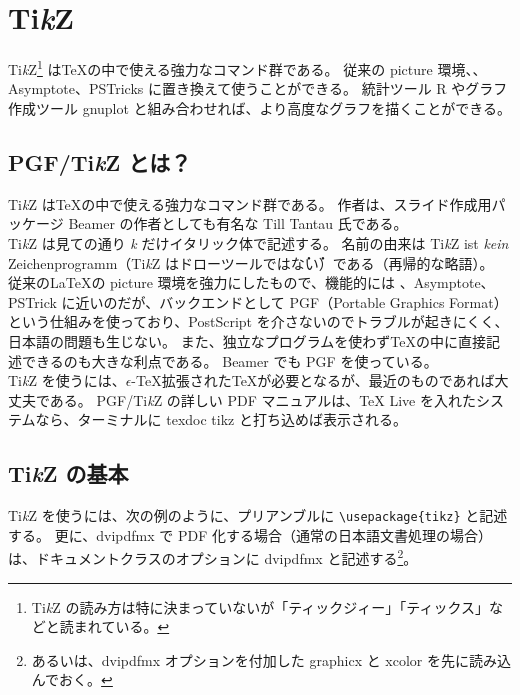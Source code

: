 \chapter{Ti\textit{k}Z}
Ti\textit{k}Z\footnote{Ti\textit{k}Z の読み方は特に決まっていないが「ティックジィー」「ティックス」などと読まれている。} は\TeX{}の中で使える強力なコマンド群である。
従来の picture 環境、\MP、Asymptote、PSTricks に置き換えて使うことができる。
統計ツール R やグラフ作成ツール gnuplot と組み合わせれば、より高度なグラフを描くことができる。
\section{PGF/Ti\textit{k}Z とは？}
Ti\textit{k}Z は\TeX{}の中で使える強力なコマンド群である。
作者は、スライド作成用パッケージ Beamer の作者としても有名な Till Tantau 氏である。\\

Ti\textit{k}Z は見ての通り \textit{k} だけイタリック体で記述する。
名前の由来は Ti\textit{k}Z ist \textit{kein} Zeichenprogramm（Ti\textit{k}Z はドローツールでは\.な\.い）である（再帰的な略語）。
従来の\LaTeX{}の picture 環境を強力にしたもので、機能的には \MP、Asymptote、PSTrick に近いのだが、バックエンドとして PGF（Portable Graphics Format）という仕組みを使っており、PostScript を介さないのでトラブルが起きにくく、日本語の問題も生じない。
また、独立なプログラムを使わず\TeX{}の中に直接記述できるのも大きな利点である。
Beamer でも PGF を使っている。\\

Ti\textit{k}Z を使うには、$\epsilon$-\TeX{}拡張された\TeX{}が必要となるが、最近のものであれば大丈夫である。
PGF/Ti\textit{k}Z の詳しい PDF マニュアルは、\TeX{} Live を入れたシステムなら、ターミナルに texdoc tikz と打ち込めば表示される。
\section{Ti\textit{k}Z の基本}
Ti\textit{k}Z を使うには、次の例のように、プリアンブルに \verb'\usepackage{tikz}' と記述する。
更に、dvipdfmx で PDF 化する場合（通常の日本語文書処理の場合）は、ドキュメントクラスのオプションに dvipdfmx と記述する\footnote{あるいは、dvipdfmx オプションを付加した graphicx と xcolor を先に読み込んでおく。}。\\

